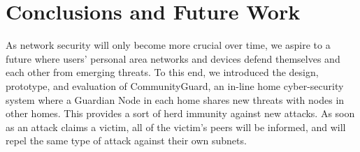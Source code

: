 \section{Conclusions and Future Work}
\label{sec:concl}

As network security will only become more crucial over time, we aspire to a future where users' personal area networks and devices defend themselves and each other from emerging threats. To this end, we introduced the design, prototype, and evaluation of CommunityGuard, an in-line home cyber-security system where a Guardian Node in each home shares new threats with nodes in other homes. This provides a sort of herd immunity against new attacks. As soon as an attack claims a victim, all of the victim's peers will be informed, and will repel the same type of attack against their own subnets. 


%
%

